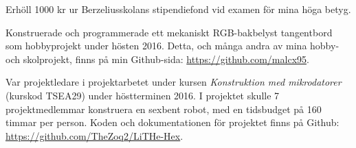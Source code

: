 \documentclass[a4paper,notitlepage]{article}
\begin{document}
Erhöll 1000 kr ur Berzeliusskolans stipendiefond vid examen för mina höga
betyg.

Konstruerade och programmerade ett mekaniskt RGB-bakbelyst tangentbord som
hobbyprojekt under hösten 2016. Detta, och många andra av mina hobby- och skolprojekt, finns på min Github-sida: \url{https://github.com/malcx95}.

Var projektledare i projektarbetet under kursen \textit{Konstruktion med
mikrodatorer} (kurskod TSEA29) under höstterminen 2016.
I projektet skulle 7 projektmedlemmar
konstruera en sexbent robot, med en tidsbudget på 160 timmar per person. Koden
och dokumentationen för projektet finns på Github:
\url{https://github.com/TheZoq2/LiTHe-Hex}.
\end{document}
